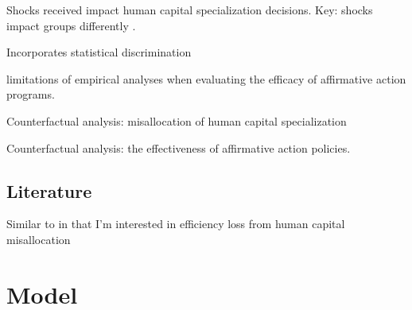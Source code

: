 \documentclass[10 pt]{article}
\begin{document}
{\begin{outline}
\begin{blist}
\item Shocks received impact human capital specialization decisions. Key: shocks impact groups differently .

\item Incorporates statistical discrimination 

\item limitations of empirical analyses when evaluating the efficacy of affirmative action programs. 

\item Counterfactual analysis: misallocation of human capital specialization

\item Counterfactual analysis: the effectiveness of affirmative action policies. 

\end{blist}





\end{outline}

\subsection*{Literature}

\begin{blist}

\item Similar to \textcite{D08} in that I'm interested in efficiency loss from human capital misallocation 

\end{blist}


} %


\section{Model}
\end{document}
